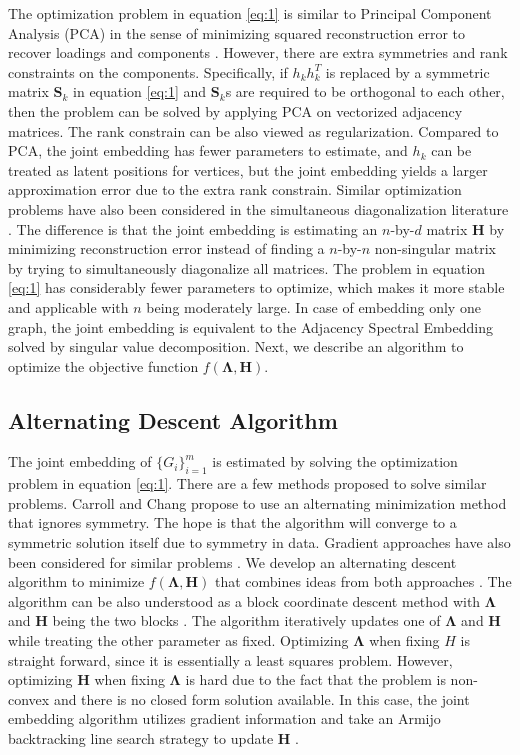 \documentclass[10pt,journal,compsoc]{IEEEtran}
\newcommand{\bH}{\mathbf{H}}
\newcommand{\bS}{\mathbf{S}}
\newcommand{\bLambda}{\mathbf{\Lambda}}
\begin{document}
\noindent The optimization problem in equation \eqref{eq:1} is similar to Principal Component Analysis (PCA) in the sense of minimizing squared reconstruction error to recover loadings and components \cite{jolliffe2002principal}. However, there are extra symmetries and rank constraints on the components. Specifically, if $h_k h_k^T$ is replaced by a symmetric matrix $\bS_k$ in equation \eqref{eq:1} and $\bS_k$s are required to be orthogonal to each other, then the problem can be solved by applying PCA on vectorized adjacency matrices. The rank constrain can be also viewed as regularization. Compared to PCA, the joint embedding has fewer parameters to estimate, and $h_k$ can be treated as latent positions for vertices, but the joint embedding yields a larger approximation error due to the extra rank constrain. Similar optimization problems have also been considered in the simultaneous diagonalization literature \cite{flury1986algorithm,ziehe2004fast}. The difference is that the joint embedding is estimating an $n$-by-$d$ matrix $\bH$ by minimizing reconstruction error instead of finding a $n$-by-$n$ non-singular matrix by trying to simultaneously diagonalize all matrices. The problem in equation \eqref{eq:1} has considerably fewer parameters to optimize, which makes it more stable and applicable with $n$ being moderately large. In case of embedding only one graph, the joint embedding is equivalent to the Adjacency Spectral Embedding solved by singular value decomposition\cite{sussman2012consistent}. Next, we describe an algorithm to optimize the objective function $f(\bLambda,\bH)$.  

\subsection{Alternating Descent Algorithm}
\noindent The joint embedding of $\{G_i \} _{i=1}^{m}$ is estimated by solving the optimization problem in equation \eqref{eq:1}. There are a few methods proposed to solve similar problems. Carroll and Chang \cite{carroll1970analysis} propose to use an alternating minimization method that ignores symmetry. The hope is that the algorithm will converge to a symmetric solution itself due to symmetry in data. Gradient approaches have also been considered for similar problems \cite{tang2009clustering, kolda2015numerical}. We develop an alternating descent algorithm to minimize $f(\bLambda,\bH)$ that combines ideas from both approaches \cite{bezdek2003convergence}. The algorithm can be also understood as a block coordinate descent method with $\bLambda$ and $\bH$ being the two blocks \cite{wright2015coordinate,beck2013convergence}. The algorithm iteratively updates one of $\bLambda$ and $\bH$ while treating the other parameter as fixed. Optimizing $\bLambda$ when fixing $H$ is straight forward, since it is essentially a least squares problem. However, optimizing $\bH$ when fixing $\bLambda$ is hard due to the fact that the problem is non-convex and there is no closed form solution available. In this case, the joint embedding algorithm utilizes gradient information and take an Armijo backtracking line search strategy to update $\bH$  \cite{nocedal2006numerical}. \\
\end{document}
